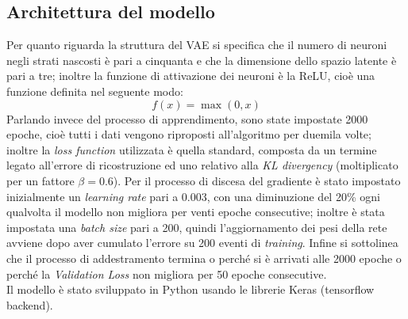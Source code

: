 





\subsection{Architettura del modello}
\label{architettura del modello}
Per quanto riguarda la struttura del VAE si specifica che il numero di neuroni negli strati nascosti è pari a cinquanta e che la dimensione dello spazio latente è pari a tre; inoltre la funzione di attivazione dei neuroni è la ReLU, cioè una funzione definita nel seguente modo:
\begin{equation}
	f(x) = \max(0,x)
\end{equation} 
Parlando invece del processo di apprendimento, sono state impostate 2000 epoche, cioè tutti i dati vengono riproposti all'algoritmo per duemila volte; inoltre la \textit{loss function} utilizzata è quella standard, composta da un termine legato all'errore di ricostruzione ed uno relativo alla \textit{KL divergency} (moltiplicato per un fattore $\beta=0.6$). Per il processo di discesa del gradiente è stato impostato inizialmente un \textit{learning rate} pari a 0.003, con una diminuzione del 20\% ogni qualvolta il modello non migliora per venti epoche consecutive; inoltre è stata impostata una \textit{batch size} pari a 200, quindi l'aggiornamento dei pesi della rete avviene dopo aver cumulato l'errore su 200 eventi di \textit{training}. Infine si sottolinea che il processo di addestramento termina o perché si è arrivati alle 2000 epoche o perché la \textit{Validation Loss} non migliora per 50 epoche consecutive.\\
Il modello è stato sviluppato in Python usando le librerie Keras (tensorflow backend).


